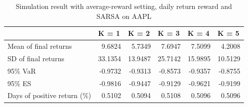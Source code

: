 \documentclass{article}
\begin{document}
\begin{table}[H]
\centering
\begin{tabular}{|l|r|r|r|r|r|} 
\hline
                             & \multicolumn{1}{l|}{K = 1} & \multicolumn{1}{l|}{K = 2} & \multicolumn{1}{l|}{K = 3} & \multicolumn{1}{l|}{K = 4} & \multicolumn{1}{l|}{K = 5}  \\ 
\hline
Mean of final returns        & 9.6824                     & 5.7349                     & 7.6947                     & 7.5099                     & 4.2008                      \\ 
\hline
SD of final returns          & 33.1354                    & 13.9487                    & 25.7142                    & 15.9895                    & 10.5129                     \\ 
\hline
95\% VaR                     & -0.9732                    & -0.9313                    & -0.8573                    & -0.9357                    & -0.8755                     \\ 
\hline
95\% ES                      & -0.9816                    & -0.9447                    & -0.9129                    & -0.9621                    & -0.9199                     \\ 
\hline
Days of positive return (\%) & 0.5102                     & 0.5094                     & 0.5108                     & 0.5096                     & 0.5096                      \\
\hline
\end{tabular}
\caption{Simulation result with average-reward setting, daily return reward and SARSA on AAPL}
\label{table3}
\end{table}
\end{document}
